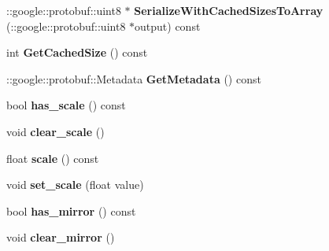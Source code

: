 \begin{DoxyCompactItemize}
\mbox{\label{classcaffe_1_1_transformation_parameter_a9820e83c6154ff51d2e29ab90b75732c}} 
\+::google\+::protobuf\+::uint8 $\ast$ {\bfseries Serialize\+With\+Cached\+Sizes\+To\+Array} (\+::google\+::protobuf\+::uint8 $\ast$output) const
\item 
\mbox{\label{classcaffe_1_1_transformation_parameter_a2bd6ed5fe1d21fa334a653c5155a3d52}} 
int {\bfseries Get\+Cached\+Size} () const
\item 
\mbox{\label{classcaffe_1_1_transformation_parameter_afcb1b92733fab416f9cf80d5660153c2}} 
\+::google\+::protobuf\+::\+Metadata {\bfseries Get\+Metadata} () const
\item 
\mbox{\label{classcaffe_1_1_transformation_parameter_a5c8c8b008ef1d7c3be84ea7e237a4fee}} 
bool {\bfseries has\+\_\+scale} () const
\item 
\mbox{\label{classcaffe_1_1_transformation_parameter_a7673e6ebf08bdea8088e3a1c771ab056}} 
void {\bfseries clear\+\_\+scale} ()
\item 
\mbox{\label{classcaffe_1_1_transformation_parameter_ae44a63e4ce468d5de118eb4e33bfcca7}} 
float {\bfseries scale} () const
\item 
\mbox{\label{classcaffe_1_1_transformation_parameter_af93bb2722dffac1c0dcfe1d37a228ab6}} 
void {\bfseries set\+\_\+scale} (float value)
\item 
\mbox{\label{classcaffe_1_1_transformation_parameter_a079f416db9fce574be300207da102aa5}} 
bool {\bfseries has\+\_\+mirror} () const
\item 
\mbox{\label{classcaffe_1_1_transformation_parameter_a64bfe8dee9c12e741c7e82fd0dbbd3ad}} 
void {\bfseries clear\+\_\+mirror} ()
\item 
\mbox{\label{classcaffe_1_1_transformation_parameter_a4ac30173a483b2a418a41cb5b2d42a8d}} 

\end{DoxyCompactItemize}
